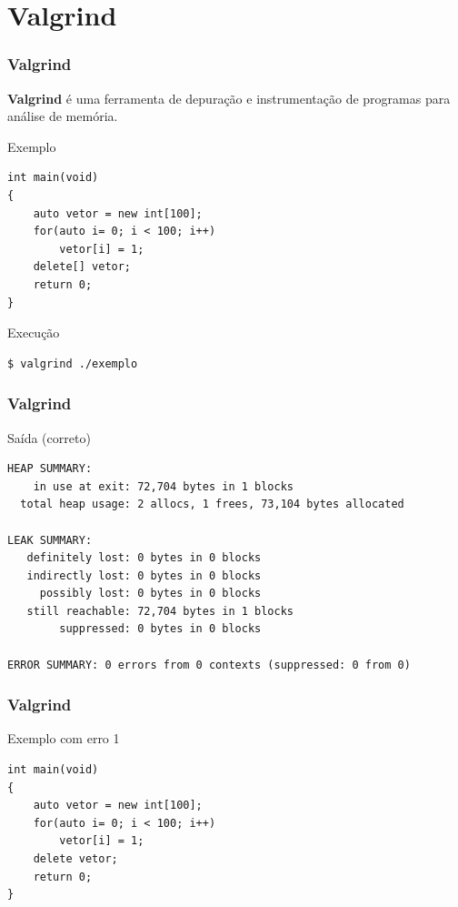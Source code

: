 \documentclass[xcolor={usenames,dvipsnames},10pt,compress,aspectratio=169]{beamer}
\begin{document}
\section{Valgrind}
\begin{frame}[fragile]
  \frametitle{Valgrind}
  \textbf{Valgrind} é uma ferramenta de depuração e instrumentação
  de programas para análise de memória.
  \begin{block}{Exemplo}
\begin{lstlisting}
int main(void)
{
    auto vetor = new int[100];
    for(auto i= 0; i < 100; i++)
        vetor[i] = 1;
    delete[] vetor;
    return 0;
}
\end{lstlisting}
\end{block}
%
  \begin{alertblock}{Execução}
\begin{lstlisting}
$ valgrind ./exemplo
\end{lstlisting}
\end{alertblock}
\end{frame}
\begin{frame}[fragile]
  \frametitle{Valgrind}
  \begin{block}{Saída (correto)}
\begin{lstlisting}
HEAP SUMMARY:
    in use at exit: 72,704 bytes in 1 blocks
  total heap usage: 2 allocs, 1 frees, 73,104 bytes allocated

LEAK SUMMARY:
   definitely lost: 0 bytes in 0 blocks
   indirectly lost: 0 bytes in 0 blocks
     possibly lost: 0 bytes in 0 blocks
   still reachable: 72,704 bytes in 1 blocks
        suppressed: 0 bytes in 0 blocks

ERROR SUMMARY: 0 errors from 0 contexts (suppressed: 0 from 0)
\end{lstlisting}
\end{block}
\end{frame}
\begin{frame}[fragile]
  \frametitle{Valgrind}
  \begin{block}{Exemplo com erro 1}
\begin{lstlisting}
int main(void)
{
    auto vetor = new int[100];
    for(auto i= 0; i < 100; i++)
        vetor[i] = 1;
    delete vetor;
    return 0;
}
\end{lstlisting}
\end{block}
\end{frame}
\end{document}
